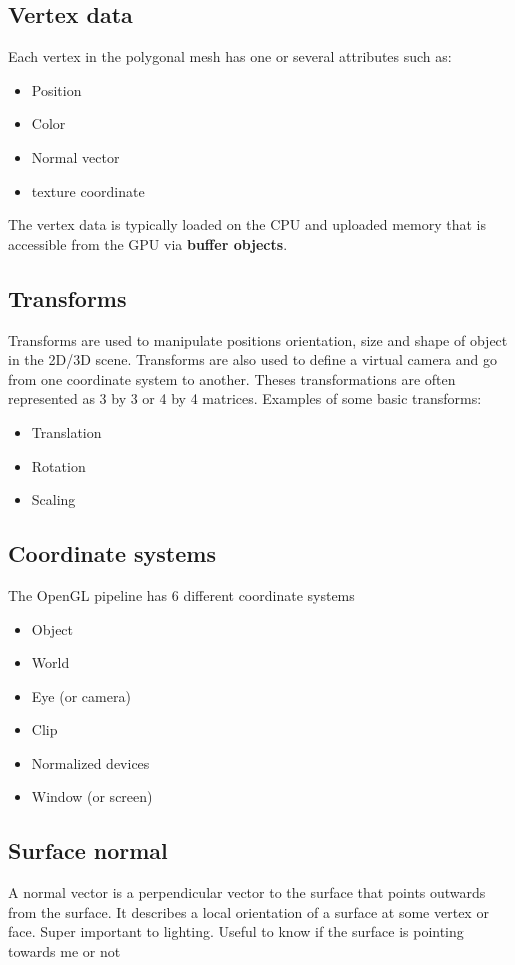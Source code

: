 \subsection*{Vertex data}
Each vertex in the polygonal mesh has one or several attributes such as:

\begin{itemize}
	\item Position
	\item Color
	\item Normal vector
	\item texture coordinate
\end{itemize}

The vertex data is typically loaded on the CPU and uploaded memory that is accessible from the GPU via \textbf{buffer objects}.

\subsection*{Transforms}
Transforms are used to manipulate positions orientation, size and shape of object in the 2D/3D scene. Transforms are also used to define a virtual camera and go from one coordinate system to another. Theses transformations are often represented as 3 by 3 or 4 by 4 matrices. Examples of some basic transforms:

\begin{itemize}
	\item Translation
	\item Rotation
	\item Scaling
\end{itemize}

\subsection*{Coordinate systems}
The OpenGL pipeline has 6 different coordinate systems

\begin{itemize}
	\item Object 
	\item World
	\item Eye (or camera)
	\item Clip
	\item Normalized devices
	\item Window (or screen)
\end{itemize}

\subsection*{Surface normal}
A normal vector is a perpendicular vector to the surface that points outwards from the surface. It describes a local orientation of a surface at some vertex or face. Super important to lighting. Useful to know if the surface is pointing towards me or not 


